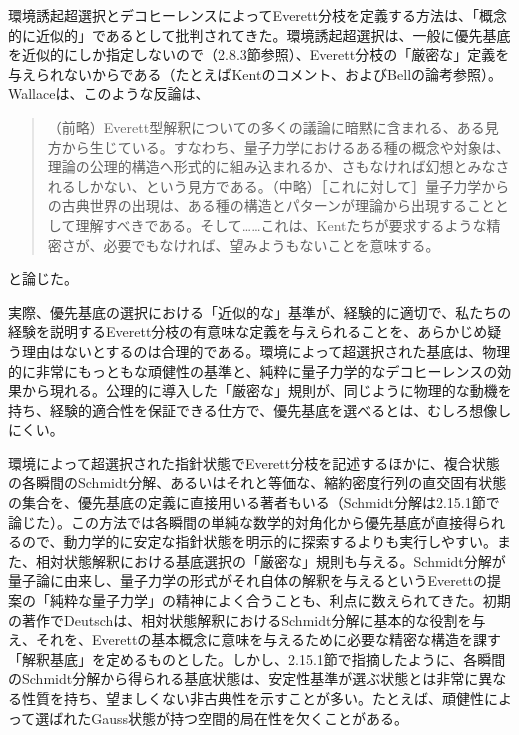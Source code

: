 環境誘起超選択とデコヒーレンスによってEverett分枝を定義する方法は、「概念的に近似的」であるとして批判されてきた。環境誘起超選択は、一般に優先基底を近似的にしか指定しないので（2.8.3節参照）、Everett分枝の「厳密な」定義を与えられないからである（たとえばKentのコメント\cite{ref411}、およびBellの論考\cite{ref412}参照）。Wallace\cite[90--91頁]{ref407}は、このような反論は、
\begin{quote}
（前略）Everett型解釈についての多くの議論に暗黙に含まれる、ある見方から生じている。すなわち、量子力学におけるある種の概念や対象は、理論の公理的構造へ形式的に組み込まれるか、さもなければ幻想とみなされるしかない、という見方である。（中略）［これに対して］量子力学からの古典世界の出現は、ある種の構造とパターンが理論から出現することとして理解すべきである。そして……これは、Kent\cite{ref411}たちが要求するような精密さが、必要でもなければ、望みようもないことを意味する。
\end{quote}
と論じた。


\hypertarget{srcpage:339}{}\label{srcpage:339}
実際、優先基底の選択における「近似的な」基準が、経験的に適切で、私たちの経験を説明するEverett分枝の有意味な定義を与えられることを、あらかじめ疑う理由はないとするのは合理的である。環境によって超選択された基底は、物理的に非常にもっともな頑健性の基準と、純粋に量子力学的なデコヒーレンスの効果から現れる。公理的に導入した「厳密な」規則が、同じように物理的な動機を持ち、経験的適合性を保証できる仕方で、優先基底を選べるとは、むしろ想像しにくい。

環境によって超選択された指針状態でEverett分枝を記述するほかに、複合状態の各瞬間のSchmidt分解、あるいはそれと等価な、縮約密度行列の直交固有状態の集合を、優先基底の定義に直接用いる著者もいる（Schmidt分解は2.15.1節で論じた）。この方法では各瞬間の単純な数学的対角化から優先基底が直接得られるので、動力学的に安定な指針状態を明示的に探索するよりも実行しやすい。また、相対状態解釈における基底選択の「厳密な」規則も与える。Schmidt分解が量子論に由来し、量子力学の形式がそれ自体の解釈を与えるというEverettの提案の「純粋な量子力学」の精神によく合うことも、利点に数えられてきた\cite{ref147}。初期の著作でDeutsch\cite{ref398}は、相対状態解釈におけるSchmidt分解に基本的な役割を与え、それを、Everettの基本概念に意味を与えるために必要な精密な構造を課す「解釈基底」を定めるものとした。しかし、2.15.1節で指摘したように、各瞬間のSchmidt分解から得られる基底状態は、安定性基準が選ぶ状態とは非常に異なる性質を持ち、望ましくない非古典性を示すことが多い。たとえば、頑健性によって選ばれたGauss状態が持つ空間的局在性を欠くことがある\cite{ref409}。

